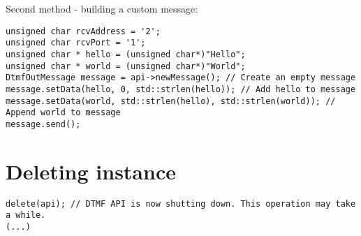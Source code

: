 Second method - building a custom message:
\begin{lstlisting}[language={[ANSI]C++},caption={Sending data example 2},label=SendingDataEx2]
unsigned char rcvAddress = '2';
unsigned char rcvPort = '1';
unsigned char * hello = (unsigned char*)"Hello";
unsigned char * world = (unsigned char*)"World";
DtmfOutMessage message = api->newMessage(); // Create an empty message
message.setData(hello, 0, std::strlen(hello)); // Add hello to message
message.setData(world, std::strlen(hello), std::strlen(world)); // Append world to message
message.send();
\end{lstlisting}


\section{Deleting instance}
\begin{lstlisting}[float=htb,language={[ANSI]C++},caption={Deleting instance example},label=DeletingInstanceEx]
delete(api); // DTMF API is now shutting down. This operation may take a while.
(...)
\end{lstlisting}